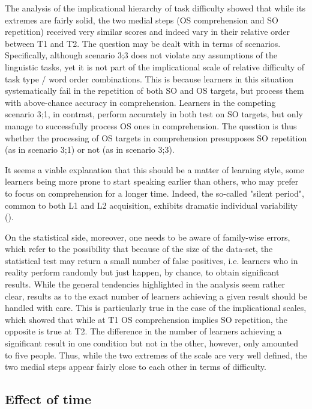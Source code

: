 The analysis of the implicational hierarchy of task difficulty showed that while its extremes are fairly solid, the two medial steps (OS comprehension and SO repetition) received very similar scores and indeed vary in their relative order between T1 and T2. The question may be dealt with in terms of scenarios. Specifically, although scenario 3;3 does not violate any assumptions of the linguistic tasks, yet it is not part of the implicational scale of relative difficulty of task type / word order combinations. This is because learners in this situation systematically fail in the repetition of both SO and OS targets, but process them with above-chance accuracy in comprehension. Learners in the competing scenario 3;1, in contrast, perform accurately in both test on SO targets, but only manage to successfully process OS ones in comprehension. The question is thus whether the processing of OS targets in comprehension presupposes SO repetition (as in scenario 3;1) or not (as in scenario 3;3).

It seems a viable explanation that this should be a matter of learning style, some learners being more prone to start speaking earlier than others, who may prefer to focus on comprehension for a longer time. Indeed, the so-called "silent period", common to both L1 and L2 acquisition, exhibits dramatic individual variability (\citealt{Krashen1985, Granger2004}).

On the statistical side, moreover, one needs to be aware of family-wise errors, which refer to the possibility that because of the size of the data-set, the statistical test may return a small number of false positives, i.e. learners who in reality perform randomly but just happen, by chance, to obtain significant results. While the general tendencies highlighted in the analysis seem rather clear, results as to the exact number of learners achieving a given result should be handled with care. This is particularly true in the case of the implicational scales, which showed that while at T1 OS comprehension implies SO repetition, the opposite is true at T2. The difference in the number of learners achieving a significant result in one condition but not in the other, however, only amounted to five people. Thus, while the two extremes of the scale are very well defined, the two medial steps appear fairly close to each other in terms of difficulty.

\subsection{Effect of time}\label{sec:08:4.4}

